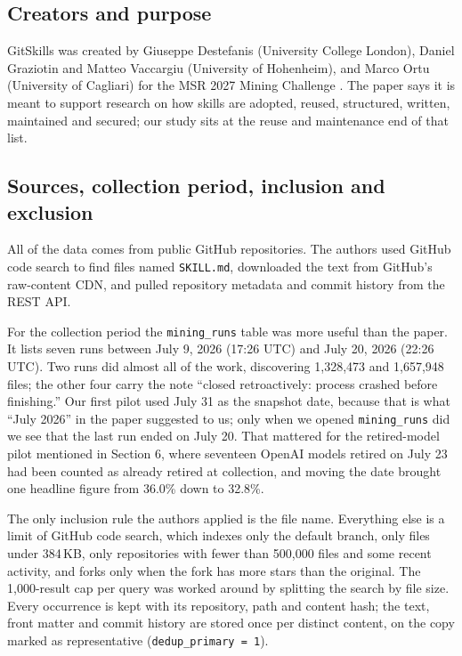 \documentclass[11pt]{article}
\begin{document}
\subsection{Creators and purpose}
GitSkills was created by Giuseppe Destefanis (University College London), Daniel Graziotin and Matteo Vaccargiu (University
of Hohenheim), and Marco Ortu (University of Cagliari) for the MSR 2027 Mining Challenge \cite{msr2027call}. The paper says it
is meant to support research on how skills are adopted, reused, structured, written, maintained and secured; our study sits
at the reuse and maintenance end of that list.

\subsection{Sources, collection period, inclusion and exclusion}
All of the data comes from public GitHub repositories. The authors used GitHub code search to find files named
\texttt{SKILL.md}, downloaded the text from GitHub's raw-content CDN, and pulled repository metadata and commit history from
the REST API.

For the collection period the \texttt{mining\_runs} table was more useful than the paper. It lists seven runs between July 9,
2026 (17:26 UTC) and July 20, 2026 (22:26 UTC). Two runs did almost all of the work, discovering 1{,}328{,}473 and
1{,}657{,}948 files; the other four carry the note ``closed retroactively: process crashed before finishing.'' Our first
pilot used July 31 as the snapshot date, because that is what ``July 2026'' in the paper suggested to us; only when we opened
\texttt{mining\_runs} did we see that the last run ended on July 20. That mattered for the retired-model pilot mentioned in
Section 6, where seventeen OpenAI models retired on July 23 had been counted as already retired at collection, and moving
the date brought one headline figure from 36.0\% down to 32.8\%.

The only inclusion rule the authors applied is the file name. Everything else is a limit of GitHub code search, which
indexes only the default branch, only files under 384\,KB, only repositories with fewer than 500{,}000 files and some recent
activity, and forks only when the fork has more stars than the original. The 1{,}000-result cap per query was worked around
by splitting the search by file size. Every occurrence is kept with its repository, path and content hash; the text, front
matter and commit history are stored once per distinct content, on the copy marked as representative
(\texttt{dedup\_primary = 1}).
\end{document}
